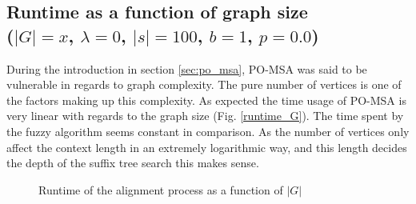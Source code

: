 \documentclass[thesis.tex]{subfiles}
\begin{document}
\subsection*{Runtime as a function of graph size\\
($|G|=x$, $\lambda=0$, $|s|=100$, $b=1$, $p=0.0$)}
During the introduction in section \ref{sec:po_msa}, PO-MSA was said to be vulnerable in regards to graph complexity. The pure number of vertices is one of the factors making up this complexity. As expected the time usage of PO-MSA is very linear with regards to the graph size (Fig. \ref{runtime_G}). The time spent by the fuzzy algorithm seems constant in comparison. As the number of vertices only affect the context length in an extremely logarithmic way, and this length decides the depth of the suffix tree search this makes sense.
\begin{figure}
  \caption{Runtime of the alignment process as a function of $|G|$}
  \label{fig:runtime_G}
\end{figure}
\end{document}
